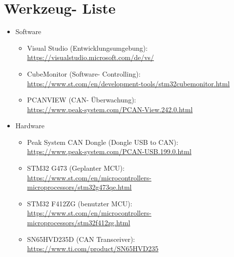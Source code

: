 \section{Werkzeug- Liste}
\label{sec:werkzeugliste}

\begin{itemize}
    \item Software
    \begin{itemize}
        \item Visual Studio (Entwicklungsumgebung):\\ \url{https://visualstudio.microsoft.com/de/vs/}
        \item CubeMonitor (Software- Controlling):\\ \url{https://www.st.com/en/development-tools/stm32cubemonitor.html}
        \item PCANVIEW (CAN- Überwachung):\\ \url{https://www.peak-system.com/PCAN-View.242.0.html}
    \end{itemize}
    \item Hardware
    \begin{itemize}
        \item Peak System CAN Dongle (Dongle USB to CAN):\\ \url{https://www.peak-system.com/PCAN-USB.199.0.html}
        \item STM32 G473 (Geplanter MCU):\\ \url{https://www.st.com/en/microcontrollers-microprocessors/stm32g473qe.html}
        \item STM32 F412ZG (benutzter MCU):\\ \url{https://www.st.com/en/microcontrollers-microprocessors/stm32f412zg.html}
        \item SN65HVD235D (CAN Transceiver):\\ \url{https://www.ti.com/product/SN65HVD235}
    \end{itemize}
\end{itemize}
